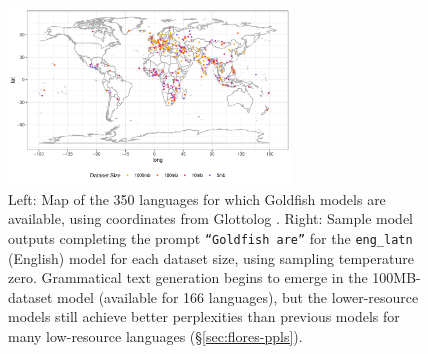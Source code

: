 \documentclass[11pt]{article}
\begin{document}
\setlength{\belowcaptionskip}{-0.3cm}
\begin{figure}[t]
    \includegraphics[width=7.5cm,trim={0 1.5cm 0 0},clip]{figures/goldfish_map.pdf} \hspace{0.0cm}
    \normalsize
    \caption{Left: Map of the 350 languages for which Goldfish models are available, using coordinates from Glottolog \citep{hammarstrom-etal-2021-glottolog}. Right: Sample model outputs completing the prompt \texttt{``Goldfish are''} for the \texttt{eng\_latn} (English) model for each dataset size, using sampling temperature zero. Grammatical text generation begins to emerge in the 100MB-dataset model (available for 166 languages), but the lower-resource models still achieve better perplexities than previous models for many low-resource languages (\S\ref{sec:flores-ppls}).
    }
    \label{fig:map-outputs}
\end{figure}
\setlength{\belowcaptionskip}{0cm}
\end{document}

